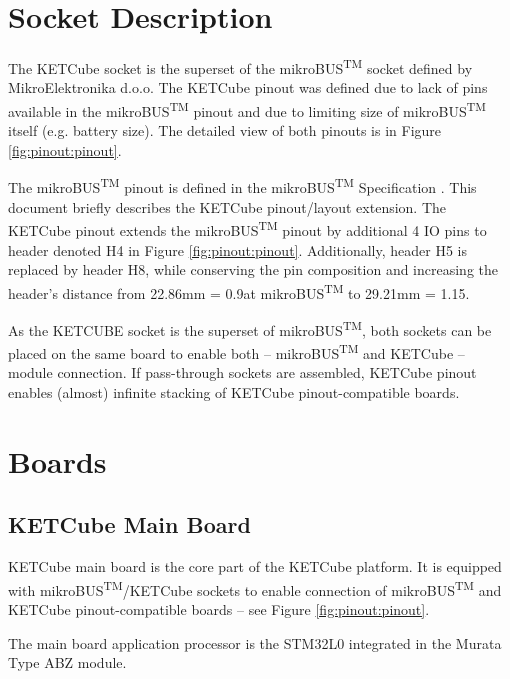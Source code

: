 \documentclass[twoside,a4paper]{refart}
\begin{document}
\clearpage
\section{Socket Description}\label{pinout}

The KETCube socket is the superset of the mikroBUS\textsuperscript{TM} socket defined by MikroElektronika d.o.o. The KETCube pinout was defined due to lack of pins available in the mikroBUS\textsuperscript{TM} pinout and due to limiting size of mikroBUS\textsuperscript{TM} itself (e.g. battery size). The detailed view of both pinouts is in Figure \ref{fig:pinout:pinout}.

The mikroBUS\textsuperscript{TM} pinout is defined in the mikroBUS\textsuperscript{TM} Specification \cite{MikroE:mikroBUS}. This document briefly describes the KETCube pinout/layout extension. The KETCube pinout extends the mikroBUS\textsuperscript{TM} pinout by additional 4 IO pins to header denoted H4 in Figure \ref{fig:pinout:pinout}. Additionally, header H5 is replaced by header H8, while conserving the pin composition and increasing the header's distance from 22.86mm = 0.9\textquotedbl at mikroBUS\textsuperscript{TM} to 29.21mm = 1.15\textquotedbl.

As the KETCUBE socket is the superset of mikroBUS\textsuperscript{TM}, both sockets can be placed on the same board to enable both -- mikroBUS\textsuperscript{TM} and KETCube -- module connection. If pass-through sockets are assembled, KETCube pinout enables (almost) infinite stacking of KETCube pinout-compatible boards.


\clearpage
\section{Boards}\label{boards}

\subsection{KETCube Main Board}
  KETCube main board is the core part of the KETCube platform. It is equipped with mikroBUS\textsuperscript{TM}/KETCube sockets to enable connection of mikroBUS\textsuperscript{TM} and KETCube pinout-compatible boards -- see Figure \ref{fig:pinout:pinout}.
  
  The main board application processor is the STM32L0 \cite{STM32:STM32L082CZ} integrated in the Murata Type ABZ \cite{Murata:ABZ} module.
   
\end{document}
